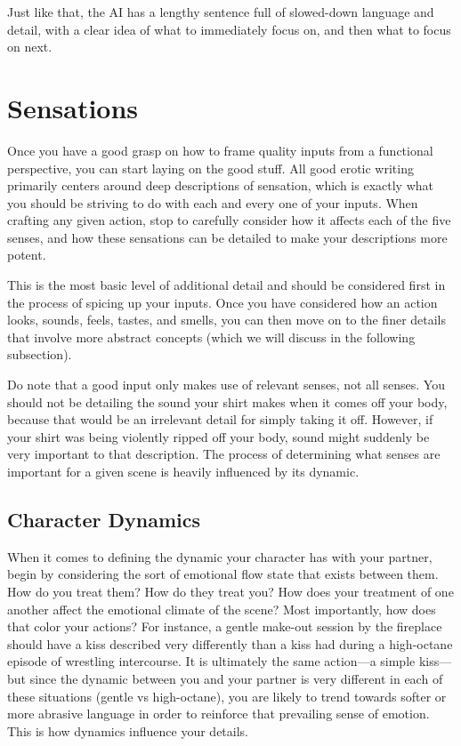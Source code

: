 ﻿\documentclass[Coomer-main.tex]{subfiles}
\begin{document}
Just like that, the AI has a lengthy sentence full of slowed-down language and detail, with a clear idea of what to immediately focus on, and then what to focus on next.

\section{Sensations}

Once you have a good grasp on how to frame quality inputs from a functional perspective, you can start laying on the good stuff.
All good erotic writing primarily centers around deep descriptions of sensation, which is exactly what you should be striving to do with each and every one of your inputs.
When crafting any given action, stop to carefully consider how it affects each of the five senses, and how these sensations can be detailed to make your descriptions more potent.

This is the most basic level of additional detail and should be considered first in the process of spicing up your inputs.
Once you have considered how an action looks, sounds, feels, tastes, and smells, you can then move on to the finer details that involve more abstract concepts (which we will discuss in the following subsection).

Do note that a good input only makes use of relevant senses, not all senses.
You should not be detailing the sound your shirt makes when it comes off your body, because that would be an irrelevant detail for simply taking it off.
However, if your shirt was being violently ripped off your body, sound might suddenly be very important to that description.
The process of determining what senses are important for a given scene is heavily influenced by its dynamic.

\subsection{Character Dynamics}

When it comes to defining the dynamic your character has with your partner, begin by considering the sort of emotional flow state that exists between them.
How do you treat them?
How do they treat you?
How does your treatment of one another affect the emotional climate of the scene?
Most importantly, how does that color your actions?
For instance, a gentle make-out session by the fireplace should have a kiss described very differently than a kiss had during a high-octane episode of wrestling intercourse.
It is ultimately the same action—a simple kiss—but since the dynamic between you and your partner is very different in each of these situations (gentle vs high-octane), you are likely to trend towards softer or more abrasive language in order to reinforce that prevailing sense of emotion.
This is how dynamics influence your details.
\end{document}
